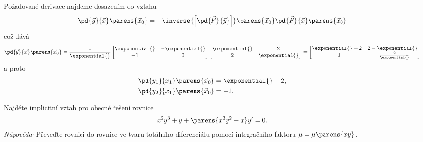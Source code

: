 \documentclass[answers]{exam}
\begin{document}
\begin{questions}
\begin{solution}
    Požadované derivace najdeme dosazením do vztahu
    \begin{equation*}
      \pd{\vec{y}}{\vec{x}}
      \parens{\vec{x}_0}
      =
      -
      \inverse{
        \left[
          \pd{\vec{F}}{\vec{y}}
        \right]
      }
			\parens{\vec{x}_0}
      \pd{\vec{F}}{\vec{x}}
      \parens{\vec{x}_0}
    \end{equation*}
    což dává
    \begin{equation*}
      \pd{\vec{y}}{\vec{x}}
      \parens{\vec{x}_0}
      =
      \frac{1}{\exponential{}}
      \begin{bmatrix}
        \exponential{} &  -\exponential{} \\
        -1 &  0
      \end{bmatrix}
      \begin{bmatrix}
        \exponential{} &  2 \\
        2 & \exponential{}
      \end{bmatrix}
      =
      \begin{bmatrix}
        \exponential{} -2 &  2 - \exponential{} \\
        -1 & - \frac{2}{\exponential{}}
      \end{bmatrix}
    \end{equation*}
    a proto
    \begin{align*}
      \pd{y_1}{x_1}
      \parens{\vec{x}_0}
      &=
        \exponential{} -2
        ,
      \\
      \pd{y_2}{x_1}
      \parens{\vec{x}_0}
      &=
        -1
        .
    \end{align*}  
	\end{solution}
	
	\question
		Najděte implicitní vztah pro obecné řešení rovnice
		\begin{equation*}
			x^2 y^3 + y + \parens{x^3 y^2 - x} y' = 0.
		\end{equation*}
		\emph{Nápověda:} Převeďte rovnici do rovnice ve tvaru totálního diferenciálu pomocí integračního faktoru $\mu = \mu\parens{xy}$.
	

\end{questions}
\end{document}
